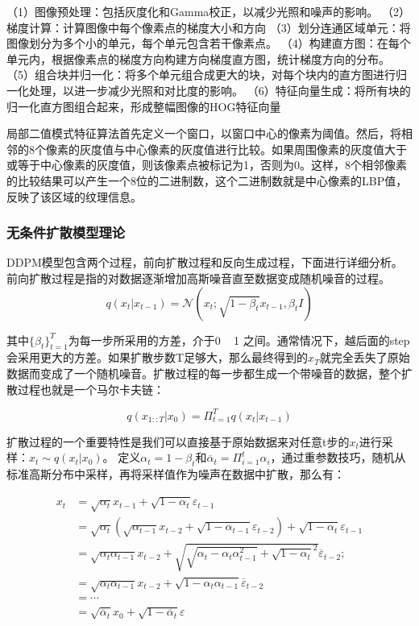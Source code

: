 （1）图像预处理：包括灰度化和Gamma校正，以减少光照和噪声的影响。
（2）‌梯度计算：‌计算图像中每个像素点的梯度大小和方向
（3）划分连通区域单元：‌将图像划分为多个小的单元，每个单元包含若干像素点。
（4）构建直方图：‌在每个单元内，根据像素点的梯度方向构建方向梯度直方图，统计梯度方向的分布。
（5）组合块并归一化：将多个单元组合成更大的块，对每个块内的直方图进行归一化处理，以进一步减少光照和对比度的影响。
（6）特征向量生成：将所有块的归一化直方图组合起来，形成整幅图像的HOG特征向量


\par
局部二值模式特征算法首先定义一个窗口‌，以窗口中心的像素为阈值。然后，将相邻的8个像素的灰度值与中心像素的灰度值进行比较。如果周围像素的灰度值大于或等于中心像素的灰度值，则该像素点被标记为1，否则为0。这样，8个相邻像素的比较结果可以产生一个8位的二进制数，这个二进制数就是中心像素的LBP值，反映了该区域的纹理信息。

\subsubsection{无条件扩散模型理论}\label{sec:DDPM}
DDPM模型包含两个过程，前向扩散过程和反向生成过程，下面进行详细分析。
前向扩散过程是指的对数据逐渐增加高斯噪音直至数据变成随机噪音的过程。
\begin{equation}\label{eqn-11}
      q(x_t|x_{t-1})=\mathcal{N}(x_t;\sqrt{1-\beta_t}x_{t-1},\beta_tI)
\end{equation}

其中$\{\beta_t\}^{T}_{t=1}$为每一步所采用的方差，介于0 ~ 1 之间。通常情况下，越后面的step会采用更大的方差。如果扩散步数T足够大，那么最终得到的$x_T$就完全丢失了原始数据而变成了一个随机噪音。扩散过程的每一步都生成一个带噪音的数据，整个扩散过程也就是一个马尔卡夫链：

\begin{equation}\label{eqn-12}
      q(x_{1::T}|x_0) = \Pi^T_{t=1}{q(x_t|x_{t-1})}
\end{equation}

扩散过程的一个重要特性是我们可以直接基于原始数据来对任意t步的$x_t$进行采样：$x_t \sim q(x_t|x_0)$。
定义$\alpha_t = 1 - \beta_t$和$\overline{\alpha}_t=\Pi^t_{i=1}{\alpha_i}$，通过重参数技巧，随机从标准高斯分布中采样，再将采样值作为噪声在数据中扩散，那么有：

$$\begin{aligned}
x_t &= \sqrt{\alpha_t}x_{t-1} + \sqrt{1-\alpha_t}\varepsilon_{t-1} \\
    &= \sqrt{\alpha_t}(\sqrt{\alpha_{t-1}}x_{t-2} + \sqrt{1-\alpha_{t-1}}\varepsilon_{t-2}) + \sqrt{1-\alpha_t}\varepsilon_{t-1} \\
    &= \sqrt{\alpha_t\alpha_{t-1}}x_{t-2} + \sqrt{\sqrt{\alpha_t-\alpha_t\alpha_{t-1}^2}+ \sqrt{1-\alpha_t}^2}\overline{\varepsilon}_{t-2}; \\
    &= \sqrt{\alpha_t\alpha_{t-1}}x_{t-2} + \sqrt{1-\alpha_t\alpha_{t-1}}\overline{\varepsilon}_{t-2} \\
    &= \cdots \\
    &= \sqrt{\overline{\alpha}_t}x_{0} + \sqrt{1-\overline{\alpha}_t}\varepsilon \label{eqn-13}
\end{aligned}$$


